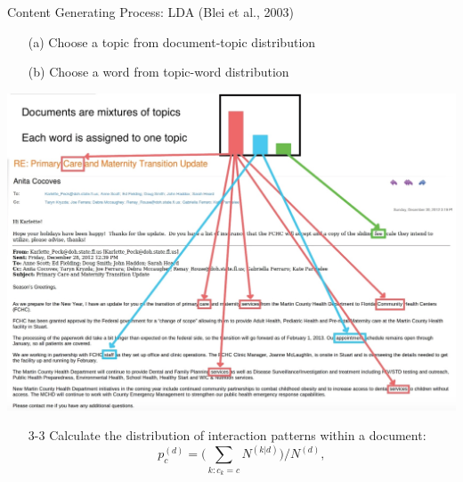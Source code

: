 \documentclass[10pt]{beamer}
\theoremstyle{definition}
\theoremstyle{remark}
\begin{document}
\begin{frame}{Content Generating Process: LDA (Blei et al., 2003)}
\begin{minipage}{0.68\linewidth}
\begin{itemize}
		\begin{itemize}
			\item[(a)] Choose a topic from document-topic distribution\vspace{0.2cm} 
			\item[(b)] Choose a word from topic-word distribution
		\end{itemize} 
			\end{itemize}
		\end{minipage}
		\begin{minipage}{0.3\linewidth}
	\includegraphics[width=1.05\textwidth]{figures/LDAimage.jpeg}
		\end{minipage}
		\vspace{0.2cm}
				\begin{itemize}\item[3-3] Calculate the distribution of interaction patterns within a document:
		 \footnotesize\begin{equation*}
		p_c^{(d)} = \Big({\sum\limits_{k: c_k=c} N^{(k|d)}}\Big)/{N^{(d)}},
		\end{equation*}\normalsize
	\end{itemize}
\ei	
\end{frame}
\end{document}
